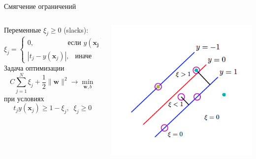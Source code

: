 \documentclass[10pt]{beamer}
\begin{document}
\begin{frame}{Смягчение ограничений}

\begin{columns}[T]
    \begin{column}{.51\textwidth}
    
    Переменные $\xi_j \geq 0$ (slacks):
    \[
    \xi_j = \begin{cases}
    0, \quad\quad\quad\quad\;\;\text{ если }y(\mathbf{x_j}) t_j \geq 1  \\
    |t_j - y(\mathbf{x}_j)|, \;\,\text{ иначе}
    \end{cases}
    \]
    Задача оптимизации
    \[
    C \sum_{j=1}^N \xi_j + \frac{1}{2}\|\mathbf{w}\|^2 \rightarrow \min_{\mathbf{w}, b}
    \]
    при условиях
    \[
		t_j y(\mathbf{x}_j) \geq 1 - \xi_j, \;\; \xi_j \geq 0
		\]

	
    \end{column}
       
    \begin{column}{.5\textwidth}
    	\vspace{-1em}
		\begin{center}
   			\includegraphics[scale=0.45]{images/slack.png}
    	\end{center}
	\end{column}
\end{columns}
  
\end{frame}
\end{document}
